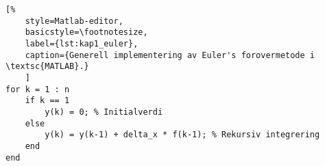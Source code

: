 \documentclass[../main.tex]{subfiles}
\begin{document}
\begin{minipage}{\textwidth}

    \begin{lstlisting}[%
    style=Matlab-editor,
    basicstyle=\footnotesize,
    label={lst:kap1_euler},
    caption={Generell implementering av Euler's forovermetode i \textsc{MATLAB}.}
    ]
for k = 1 : n
    if k == 1
        y(k) = 0; % Initialverdi
    else
        y(k) = y(k-1) + delta_x * f(k-1); % Rekursiv integrering
    end
end
\end{lstlisting}

\end{minipage}
\end{document}
